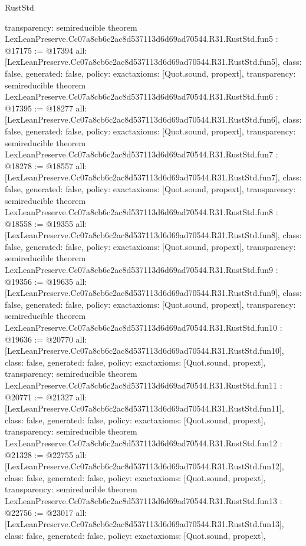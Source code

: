 \begin{lexlean}{RustStd}
\begin{coremodule}
{  transparency: semireducible
}
theorem LexLeanPreserve.Cc07a8cb6c2ac8d537113d6d69ad70544.R31.RustStd.fun5 : @17175 := @17394 {
  all: [LexLeanPreserve.Cc07a8cb6c2ac8d537113d6d69ad70544.R31.RustStd.fun5],
  class: false,
  generated: false,
  policy: exact{axioms: [Quot.sound, propext]},
  transparency: semireducible
}
theorem LexLeanPreserve.Cc07a8cb6c2ac8d537113d6d69ad70544.R31.RustStd.fun6 : @17395 := @18277 {
  all: [LexLeanPreserve.Cc07a8cb6c2ac8d537113d6d69ad70544.R31.RustStd.fun6],
  class: false,
  generated: false,
  policy: exact{axioms: [Quot.sound, propext]},
  transparency: semireducible
}
theorem LexLeanPreserve.Cc07a8cb6c2ac8d537113d6d69ad70544.R31.RustStd.fun7 : @18278 := @18557 {
  all: [LexLeanPreserve.Cc07a8cb6c2ac8d537113d6d69ad70544.R31.RustStd.fun7],
  class: false,
  generated: false,
  policy: exact{axioms: [Quot.sound, propext]},
  transparency: semireducible
}
theorem LexLeanPreserve.Cc07a8cb6c2ac8d537113d6d69ad70544.R31.RustStd.fun8 : @18558 := @19355 {
  all: [LexLeanPreserve.Cc07a8cb6c2ac8d537113d6d69ad70544.R31.RustStd.fun8],
  class: false,
  generated: false,
  policy: exact{axioms: [Quot.sound, propext]},
  transparency: semireducible
}
theorem LexLeanPreserve.Cc07a8cb6c2ac8d537113d6d69ad70544.R31.RustStd.fun9 : @19356 := @19635 {
  all: [LexLeanPreserve.Cc07a8cb6c2ac8d537113d6d69ad70544.R31.RustStd.fun9],
  class: false,
  generated: false,
  policy: exact{axioms: [Quot.sound, propext]},
  transparency: semireducible
}
theorem LexLeanPreserve.Cc07a8cb6c2ac8d537113d6d69ad70544.R31.RustStd.fun10 : @19636 := @20770 {
  all: [LexLeanPreserve.Cc07a8cb6c2ac8d537113d6d69ad70544.R31.RustStd.fun10],
  class: false,
  generated: false,
  policy: exact{axioms: [Quot.sound, propext]},
  transparency: semireducible
}
theorem LexLeanPreserve.Cc07a8cb6c2ac8d537113d6d69ad70544.R31.RustStd.fun11 : @20771 := @21327 {
  all: [LexLeanPreserve.Cc07a8cb6c2ac8d537113d6d69ad70544.R31.RustStd.fun11],
  class: false,
  generated: false,
  policy: exact{axioms: [Quot.sound, propext]},
  transparency: semireducible
}
theorem LexLeanPreserve.Cc07a8cb6c2ac8d537113d6d69ad70544.R31.RustStd.fun12 : @21328 := @22755 {
  all: [LexLeanPreserve.Cc07a8cb6c2ac8d537113d6d69ad70544.R31.RustStd.fun12],
  class: false,
  generated: false,
  policy: exact{axioms: [Quot.sound, propext]},
  transparency: semireducible
}
theorem LexLeanPreserve.Cc07a8cb6c2ac8d537113d6d69ad70544.R31.RustStd.fun13 : @22756 := @23017 {
  all: [LexLeanPreserve.Cc07a8cb6c2ac8d537113d6d69ad70544.R31.RustStd.fun13],
  class: false,
  generated: false,
  policy: exact{axioms: [Quot.sound, propext]},
}
\end{coremodule}
\end{lexlean}
